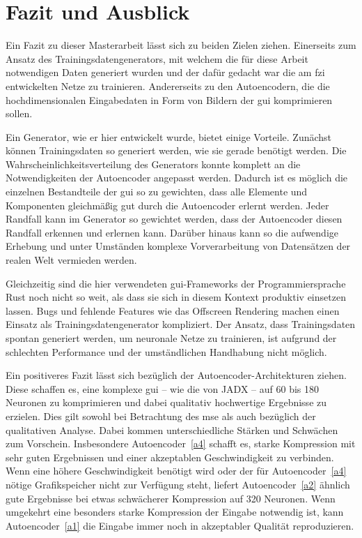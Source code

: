 \chapter{Fazit und Ausblick}
Ein Fazit zu dieser Masterarbeit lässt sich zu beiden Zielen ziehen. Einerseits zum Ansatz des Trainingsdatengenerators, mit welchem die für diese Arbeit notwendigen Daten generiert wurden und der dafür gedacht war die am \gls{fzi} entwickelten Netze zu trainieren. Andererseits zu den Autoencodern, die die hochdimensionalen Eingabedaten in Form von Bildern der \gls{gui} komprimieren sollen.


Ein Generator, wie er hier entwickelt wurde, bietet einige Vorteile. Zunächst können Trainingsdaten so generiert werden, wie sie gerade benötigt werden. Die Wahrscheinlichkeitsverteilung des Generators konnte komplett an die Notwendigkeiten der Autoencoder angepasst werden. Dadurch ist es möglich die einzelnen Bestandteile der \gls{gui} so zu gewichten, dass alle Elemente und Komponenten gleichmäßig gut durch die Autoencoder erlernt werden. Jeder Randfall kann im Generator so gewichtet werden, dass der Autoencoder diesen Randfall erkennen und erlernen kann. Darüber hinaus kann so die aufwendige Erhebung und unter Umständen komplexe Vorverarbeitung von Datensätzen der realen Welt vermieden werden.

Gleichzeitig sind die hier verwendeten \gls{gui}-Frameworks der Programmiersprache Rust noch nicht so weit, als dass sie sich in diesem Kontext produktiv einsetzen lassen. Bugs und fehlende Features wie das Offscreen Rendering machen einen Einsatz als Trainingsdatengenerator kompliziert. Der Ansatz, dass Trainingsdaten spontan generiert werden, um neuronale Netze zu trainieren, ist aufgrund der schlechten Performance und der umständlichen Handhabung nicht möglich.


Ein positiveres Fazit lässt sich bezüglich der Autoencoder-Architekturen ziehen. Diese schaffen es, eine komplexe \gls{gui} -- wie die von JADX -- auf 60 bis 180 Neuronen zu komprimieren und dabei qualitativ hochwertige Ergebnisse zu erzielen. Dies gilt sowohl bei Betrachtung des \gls{mse} als auch bezüglich der qualitativen Analyse. Dabei kommen unterschiedliche Stärken und Schwächen zum Vorschein. Insbesondere Autoencoder~\ref{a4} schafft es, starke Kompression mit sehr guten Ergebnissen und einer akzeptablen Geschwindigkeit zu verbinden. Wenn eine höhere Geschwindigkeit benötigt wird oder der für Autoencoder~\ref{a4} nötige Grafikspeicher nicht zur Verfügung steht, liefert Autoencoder~\ref{a2} ähnlich gute Ergebnisse bei etwas schwächerer Kompression auf 320 Neuronen. Wenn umgekehrt eine besonders starke Kompression der Eingabe notwendig ist, kann Autoencoder~\ref{a1} die Eingabe immer noch in akzeptabler Qualität reproduzieren.

